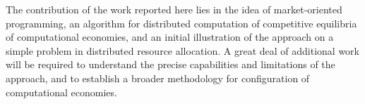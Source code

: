 The contribution of the work reported here lies in the idea of 
market-oriented programming, an algorithm for distributed 
computation of competitive equilibria of computational economies, and 
an initial illustration of the approach on a simple problem in 
distributed resource allocation.  A great deal of additional work will be 
required to understand the precise capabilities and limitations of the 
approach, and to establish a broader methodology for configuration of 
computational economies.















